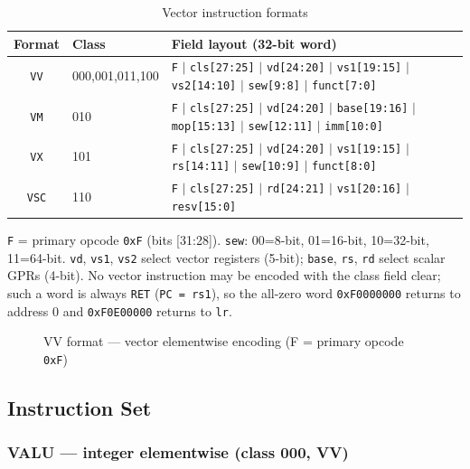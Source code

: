 \documentclass[11pt,a4paper]{article}
\begin{document}
\begin{table}[H]
\centering
\caption{Vector instruction formats}
\footnotesize
\begin{tabular}{clp{10cm}}
\toprule
Format & Class & Field layout (32-bit word) \\
\midrule
{\tt VV} & 000,001,011,100 & {\tt F} $\mid$ {\tt cls[27:25]} $\mid$ {\tt vd[24:20]} $\mid$ {\tt vs1[19:15]} $\mid$ {\tt vs2[14:10]} $\mid$ {\tt sew[9:8]} $\mid$ {\tt funct[7:0]} \\
{\tt VM} & 010 & {\tt F} $\mid$ {\tt cls[27:25]} $\mid$ {\tt vd[24:20]} $\mid$ {\tt base[19:16]} $\mid$ {\tt mop[15:13]} $\mid$ {\tt sew[12:11]} $\mid$ {\tt imm[10:0]} \\
{\tt VX} & 101 & {\tt F} $\mid$ {\tt cls[27:25]} $\mid$ {\tt vd[24:20]} $\mid$ {\tt vs1[19:15]} $\mid$ {\tt rs[14:11]} $\mid$ {\tt sew[10:9]} $\mid$ {\tt funct[8:0]} \\
{\tt VSC} & 110 & {\tt F} $\mid$ {\tt cls[27:25]} $\mid$ {\tt rd[24:21]} $\mid$ {\tt vs1[20:16]} $\mid$ {\tt resv[15:0]} \\
\bottomrule
\end{tabular}
\end{table}

{\tt F} = primary opcode {\tt 0xF} (bits [31:28]). {\tt sew}: 00=8-bit,
01=16-bit, 10=32-bit, 11=64-bit. {\tt vd}, {\tt vs1}, {\tt vs2} select
vector registers (5-bit); {\tt base}, {\tt rs}, {\tt rd} select scalar GPRs
(4-bit). No vector instruction may be encoded with the class field clear;
such a word is always {\tt RET} ({\tt PC = rs1}), so the all-zero word
{\tt 0xF0000000} returns to address 0 and {\tt 0xF0E00000} returns to
{\tt lr}.

\begin{figure}[H]
\centering
{}
\caption{VV format --- vector elementwise encoding (F = primary opcode {\tt 0xF})}
\end{figure}

\subsection{Instruction Set}

\subsubsection*{VALU --- integer elementwise (class 000, VV)}
\end{document}

